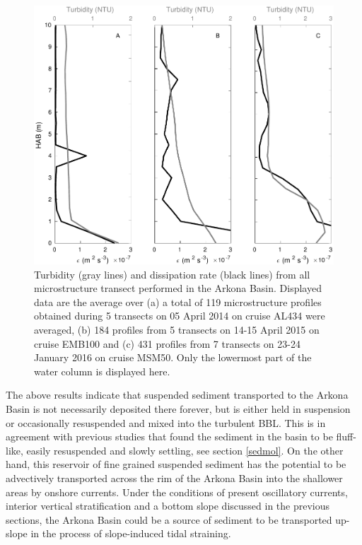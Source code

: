    \begin{figure}[ht]
\includegraphics[width=15cm]{bilder/arkona_mss.pdf}
 \caption{Turbidity (gray lines) and dissipation rate (black lines) from all 
microstructure transect performed in the Arkona Basin. Displayed data are the 
average over (a) a total of 119 microstructure profiles obtained during 5 
transects on 05 April 2014 on cruise AL434 were averaged, (b) 184 profiles from 
5 transects on 14-15 April 2015 on cruise EMB100 and (c) 431 profiles from 7 
transects on 23-24 January 2016 on cruise MSM50. Only the lowermost part of 
the water column is displayed here.}
 \label{abmss}
 \end{figure}

The above results indicate that suspended sediment transported to the 
Arkona Basin is not necessarily deposited there forever, but is either held in 
suspension or occasionally resuspended and mixed into the turbulent BBL. This 
is in agreement with previous studies that found the sediment in the basin to 
be fluff-like, easily resuspended and slowly settling, see section 
\ref{sedmol}. On the other hand, this reservoir of fine grained 
suspended sediment has the potential to be advectively 
transported across the rim of the Arkona Basin into the shallower areas by 
onshore currents. Under the conditions of present oscillatory currents, 
interior vertical stratification and a bottom slope discussed in the previous 
sections, the Arkona Basin could be a source of sediment to be transported 
up-slope in the process of slope-induced tidal straining.

